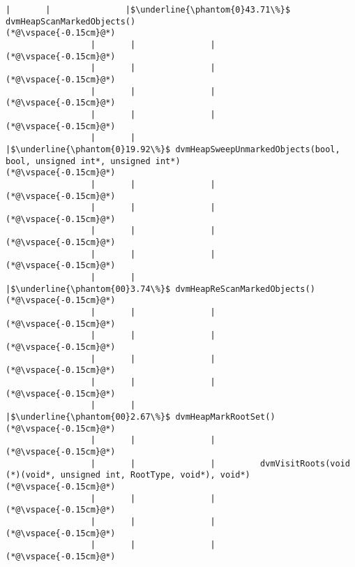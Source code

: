 \begin{lstlisting}[caption=NewDirectByteBuffer, label=profile:C2JNewDirectBuffer-512, numberbychapter=true, frame=lines, float, floatplacement=t]
                 |       |               |$\underline{\phantom{0}43.71\%}$ dvmHeapScanMarkedObjects()
(*@\vspace{-0.15cm}@*)
                 |       |               |        
(*@\vspace{-0.15cm}@*)
                 |       |               |        
(*@\vspace{-0.15cm}@*)
                 |       |               |
(*@\vspace{-0.15cm}@*)
                 |       |               |
(*@\vspace{-0.15cm}@*)
                 |       |               |$\underline{\phantom{0}19.92\%}$ dvmHeapSweepUnmarkedObjects(bool, bool, unsigned int*, unsigned int*)
(*@\vspace{-0.15cm}@*)
                 |       |               |        
(*@\vspace{-0.15cm}@*)
                 |       |               |        
(*@\vspace{-0.15cm}@*)
                 |       |               |
(*@\vspace{-0.15cm}@*)
                 |       |               |
(*@\vspace{-0.15cm}@*)
                 |       |               |$\underline{\phantom{00}3.74\%}$ dvmHeapReScanMarkedObjects()
(*@\vspace{-0.15cm}@*)
                 |       |               |        
(*@\vspace{-0.15cm}@*)
                 |       |               |        
(*@\vspace{-0.15cm}@*)
                 |       |               |
(*@\vspace{-0.15cm}@*)
                 |       |               |
(*@\vspace{-0.15cm}@*)
                 |       |               |$\underline{\phantom{00}2.67\%}$ dvmHeapMarkRootSet()
(*@\vspace{-0.15cm}@*)
                 |       |               |
(*@\vspace{-0.15cm}@*)
                 |       |               |         dvmVisitRoots(void (*)(void*, unsigned int, RootType, void*), void*)
(*@\vspace{-0.15cm}@*)
                 |       |               |        
(*@\vspace{-0.15cm}@*)
                 |       |               |        
(*@\vspace{-0.15cm}@*)
                 |       |               |
(*@\vspace{-0.15cm}@*)

\end{lstlisting}
